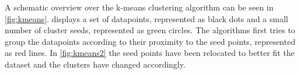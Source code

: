 \noindent
A schematic overview over the k-means clustering algorithm can be seen in \cref{fig:kmeans}.
 displays a set of datapoints, represented as black dots and a small number of
cluster seeds, represented as green circles.
The algorithms first tries to group the datapoints according to their proximity to the seed points, represented as red lines.
In \cref{fig:kmeans2} the seed points have been relocated to better fit the dataset and the clusters have changed accordingly.


